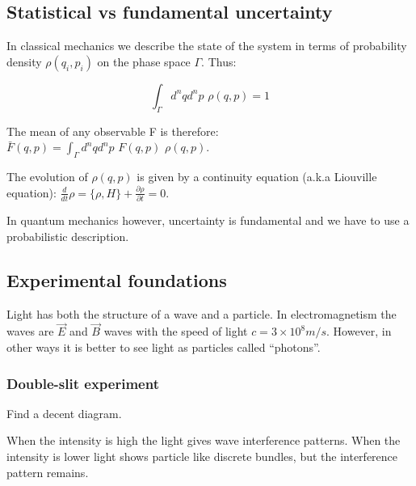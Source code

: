 \subsection{Statistical vs fundamental uncertainty}

In classical mechanics we describe the state of the system in terms of probability density $\rho (q_i, p_i)$ on the phase space $\Gamma$. Thus:

$$\int_{\Gamma} d^n q d^n p \, \, \rho (q,p) = 1$$

The mean of any observable F is therefore: $\bar{F} (q,p) = \int_{\Gamma} d^n q d^n p \, \, F(q,p)  \, \, \rho(q,p)$.

The evolution of $\rho (q,p)$ is given by a continuity equation (a.k.a Liouville equation): $\frac{d}{dt} \rho = \{\rho, H\} + \frac{\partial \rho}{\partial t} = 0$.

In quantum mechanics however, uncertainty is fundamental and we have to use a probabilistic description. 

\subsection{Experimental foundations}

Light has both the structure of a wave and a particle. In electromagnetism the waves are $\vec{E}$ and $\vec{B}$ waves with the speed of light $c = 3 \times 10^8 m/s$. However, in other ways it is better to see light as particles called ``photons''.

\subsubsection{Double-slit experiment}

Find a decent diagram.

When the intensity is high the light gives wave interference patterns. When the intensity is lower light shows particle like discrete bundles, but the interference pattern remains.